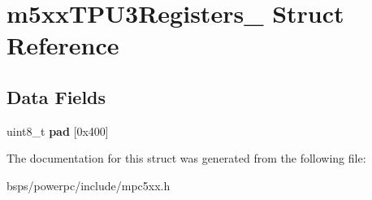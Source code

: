 \hypertarget{structm5xxTPU3Registers__}{}\section{m5xx\+T\+P\+U3\+Registers\+\_\+ Struct Reference}
\label{structm5xxTPU3Registers__}
\subsection*{Data Fields}
\begin{DoxyCompactItemize}
\item 
\mbox{\label{structm5xxTPU3Registers___a4859189235937858e416f100f121cb30}} 
uint8\+\_\+t {\bfseries pad} \mbox{[}0x400\mbox{]}
\end{DoxyCompactItemize}


The documentation for this struct was generated from the following file\+:\begin{DoxyCompactItemize}
\item 
bsps/powerpc/include/mpc5xx.\+h\end{DoxyCompactItemize}
